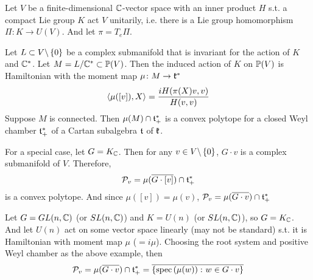 \documentclass[a4paper,12pt]{article}
\begin{document}
	\begin{thm}
		Let $V$ be a finite-dimensional $\mathbb{C}$-vector space with an inner product $H$ s.t. a compact Lie group $K$ act $V$ unitarily, i.e. there is a Lie group homomorphism $\Pi \colon K \rightarrow U(V)$. And let $\pi = T_e \Pi$. 

		Let $L \subset V \backslash \left\{0\right\}$ be a complex submanifold that is invariant for the action of $K$ and $\mathbb{C}^*$. Let $M = L/ \mathbb{C}^* \subset \mathbb{P}(V)$. Then the induced action of $K$ on $\mathbb{P}(V)$ is Hamiltonian with the moment map $\mu  \colon M \rightarrow \mathfrak{k}^*$
		\begin{equation*}
			\left\langle \mu([v]),X \right\rangle = \frac{iH(\pi(X)v,v)}{H(v,v)}
		\end{equation*}
		Suppose $M$ is connected. Then $\mu(M) \cap \mathfrak{t}^*_+$ is a convex polytope for a closed Weyl chamber $\mathfrak{t}^*_+$ of a Cartan subalgebra $\mathfrak{t}$ of $\mathfrak{k}$.
	\end{thm}
	\begin{rem}
		For a special case, let $G = K_{\mathbb{C}}$. Then for any $v \in V \backslash \left\{0\right\}$, $G \cdot v$ is a complex submanifold of $V$. Therefore,
		\begin{equation*}
			\mathcal{P}_v = \mu(\overline{G\cdot [v]}) \cap \mathfrak{t}_{+}^*
		\end{equation*}
		is a convex polytope. And since $\mu([v]) = \mu(v)$, $\mathcal{P}_v = \mu(\overline{G\cdot v}) \cap \mathfrak{t}_{+}^*$
	\end{rem}

	Let $G =GL(n,\mathbb{C})$ (or $SL(n,\mathbb{C})$) and $K = U(n)$ (or $SL(n,\mathbb{C})$), so $G = K_{\mathbb{C}}$. And let $U(n)$ act on some vector space linearly (may not be standard) s.t. it is Hamiltonian with moment map $\mu$ ($=i\mu$). Choosing the root system and positive Weyl chamber as the above example, then
	\begin{equation*}
		\mathcal{P}_v = \mu(\overline{G\cdot v}) \cap \mathfrak{t}_{+}^* = \overline{\left\{\operatorname{spec}\left(\mu(w)\right) \colon w \in G \cdot v\right\}}
	\end{equation*}
\end{document}
